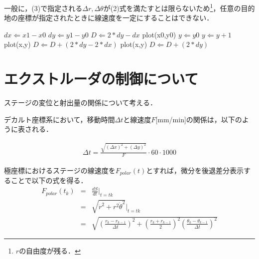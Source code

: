 \documentclass[twocolumn,oneside,a4paper]{article}
\begin{document}
一般に，(3)で指定される$\Delta r, \Delta \theta$が(2)式を満たすとは限らないため\footnote{$r$の自由度が残る．}，任意の目的地の座標が指定されたときに線速度を一定にすることはできない．

\begin{algorithm}                  
\begin{algorithmic}                  
\label{alg1}                          
\STATE $dx \Leftarrow x1-x0$
\STATE $dy \Leftarrow y1-y0$
\STATE $D \Leftarrow 2*dy - dx$
\STATE plot(x0,y0)
\STATE $y \Leftarrow y0$
\STATE      $y \Leftarrow y+1$
\STATE      plot(x,y)
\STATE      $D \Leftarrow D + (2*dy-2*dx)$
\ELSE
\STATE      plot(x,y)
\STATE      $D \Leftarrow D + (2*dy)$
\ENDIF
\ENDFOR
\end{algorithmic}
\end{algorithm}

\section{エクストルーダの制御について}
ステージの変位と射出量の関係について考える．

デカルト座標系において，移動時間$\Delta t$と線速度$F$[mm/min]の関係は，以下のように表される．

\begin{eqnarray*}
	\Delta t = \frac{\sqrt{(\Delta x)^2+(\Delta y)^2}}{F}\cdot 60\cdot1000
\end{eqnarray*}

極座標におけるステージの線速度を$F_{polar}(t)$とすれば，微分を後退差分表示することで以下の式を得る．
\begin{eqnarray*}
F_{polar}(t_k) &=& \frac{d S}{d t}\Bigg|_{t=tk} \\
&=& \sqrt{\dot{r}^2+r^2 \dot{\theta}^2}\Big|_{t=tk} \\
&=& \sqrt{\left( \frac{r_k - r_{k-1}}{\Delta t} \right)^2 + \left(\frac{r_k+r_{k-1}}{2} \right)^2 \left( \frac{\theta_k - \theta_{k-1} }{\Delta t} \right)^2}	
\end{eqnarray*}
\end{document}
